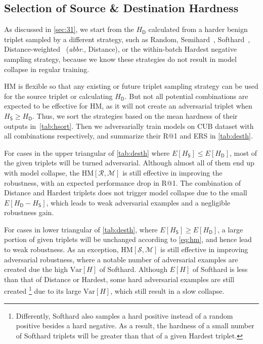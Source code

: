 \documentclass[10pt,twocolumn,letterpaper]{article}
\begin{document}
\subsection{Selection of Source \& Destination Hardness}
\label{sec:41}






As discussed in \cref{sec:31}, we start from the $H_\mathsf{D}$ calculated from
a harder benign triplet sampled by a different strategy, such as Random,
Semihard~\cite{facenet}, Softhard~\cite{revisiting},
Distance-weighted~\cite{distance} (\emph{abbr}., Distance), or the within-batch
Hardest negative sampling strategy, because we know these strategies do not
result in model collapse in regular training.


HM is flexible so that any existing or future triplet sampling strategy
can be used for the source triplet or calculating $H_\mathsf{D}$.
%
But not all potential combinations are expected to be effective for HM, as it
will not create an adversarial triplet when $H_\mathsf{S}\geqslant
H_\mathsf{D}$.
%
Thus, we sort the strategies based on the mean hardness of their
outputs in~\cref{tab:hsort}.
%
Then we adversarially train models on CUB dataset with all combinations
respectively, and summarize their R@1 and ERS in \cref{tab:desth}.



For cases in the upper triangular of \cref{tab:desth} where $E[H_\mathsf{S}]
\leqslant E[H_\mathsf{D}]$, most of the given triplets will be turned
adversarial.
%
Although almost all of them end up with model collapse, the
$\text{HM}[\mathcal{R},\mathcal{M}]$ is still effective in improving the
robustness, with an expected performance drop in R@1.
%
The combination of Distance and Hardest triplets does not trigger model
collapse due to the small $E[H_\mathsf{D}-H_\mathsf{S}]$, which leads to weak
adversarial examples and a negligible robustness gain.

For cases in lower triangular of \cref{tab:desth}, where $E[H_\mathsf{S}]
\geqslant E[H_\mathsf{D}]$, a large portion of given triplets will be unchanged
according to \cref{eq:hm}, and hence lead to weak robustness.
%
As an exception, $\text{HM}[\mathcal{S},\mathcal{M}]$ is still effective in
improving adversarial robustness, where a notable number of adversarial
examples are created due the high $\text{Var}[H]$ of Softhard.
%
Although $E[H]$ of Softhard is less than that of Distance or Hardest, some hard
adversarial examples are still created%
%
\footnote{Differently, Softhard also samples a
hard positive instead of a random positive besides a hard negative.
%
As a result, the hardness of a small number of Softhard triplets will be 
greater than that of a given Hardest triplet.}
%
due to its large $\text{Var}[H]$, which
still result in a slow collapse.
\end{document}
